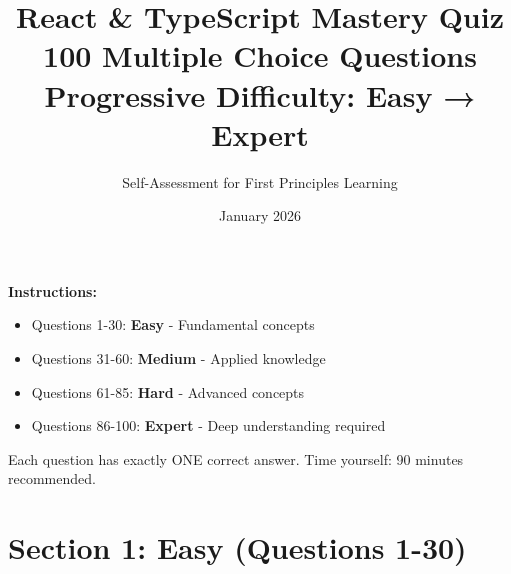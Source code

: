 \documentclass[12pt,a4paper]{article}
\title{\Huge\textbf{React \& TypeScript Mastery Quiz}\\[0.5cm]
\Large 100 Multiple Choice Questions\\[0.3cm]
\normalsize Progressive Difficulty: Easy → Expert}
\author{Self-Assessment for First Principles Learning}
\date{January 2026}
\begin{document}
\maketitle
\thispagestyle{empty}

\vspace{1cm}

\begin{center}
\begin{tcolorbox}[width=0.8\textwidth,colback=gray!5,colframe=gray!50]
\textbf{Instructions:}
\begin{itemize}
    \item Questions 1-30: \textcolor{easy}{\textbf{Easy}} - Fundamental concepts
    \item Questions 31-60: \textcolor{medium}{\textbf{Medium}} - Applied knowledge
    \item Questions 61-85: \textcolor{hard}{\textbf{Hard}} - Advanced concepts
    \item Questions 86-100: \textcolor{hard}{\textbf{Expert}} - Deep understanding required
\end{itemize}
Each question has exactly ONE correct answer. Time yourself: 90 minutes recommended.
\end{tcolorbox}
\end{center}

\newpage

\section*{\textcolor{easy}{Section 1: Easy (Questions 1-30)}}
\end{document}
